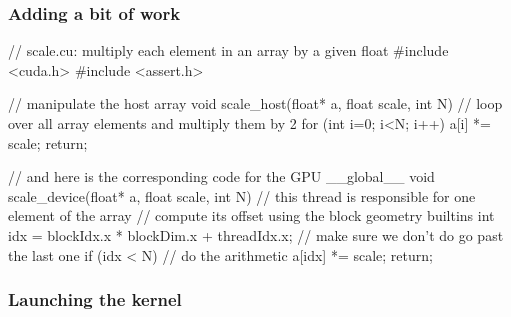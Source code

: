 \begin{frame}[fragile]
%
  \frametitle{Adding a bit of work}
  \label{slide:hello-world-cuda}
%
  \begin{C}
// scale.cu: multiply each element in an array by a given float
#include <cuda.h>
#include <assert.h>

// manipulate the host array
void scale_host(float* a, float scale, int N) {
    // loop over all array elements and multiply them by 2 
    for (int i=0; i<N; i++) {
        a[i] *= scale;
    }
    return;
}

// and here is the corresponding code for the GPU
__global__ void scale_device(float* a, float scale, int N) {
    // this thread is responsible for one element of the array
    // compute its offset using the block geometry builtins
    int idx = blockIdx.x * blockDim.x  + threadIdx.x;
    // make sure we don't do go past the last one
    if (idx < N) {
        // do the arithmetic
        a[idx] *= scale;
    }
    return;
}
  \end{C}
%
\end{frame}

\begin{frame}[fragile]
%
  \frametitle{Launching the kernel}
  \label{slide:launching-kernel-cuda}
%
%
\end{frame}

